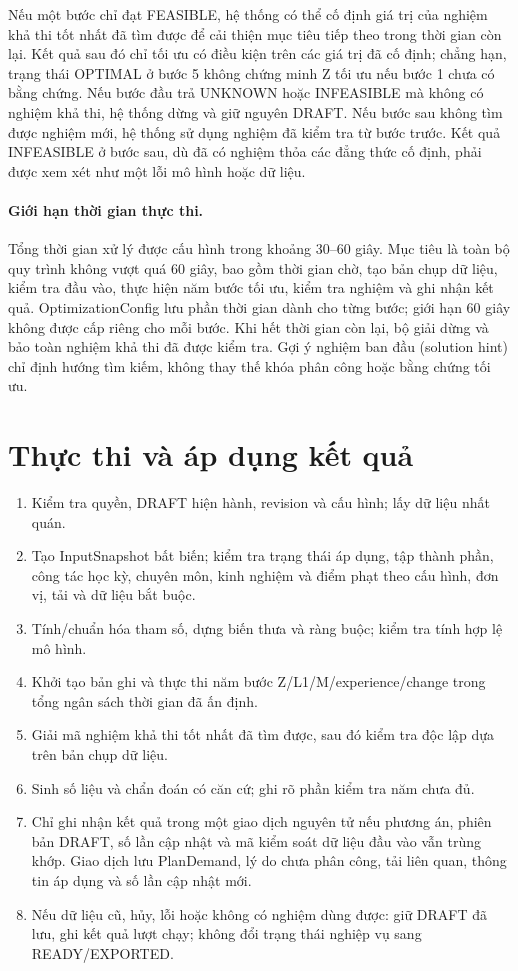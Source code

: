 \documentclass[12pt,a4paper]{report}
\newcommand{\code}[1]{\texttt{\detokenize{#1}}}
\begin{document}
Nếu một bước chỉ đạt FEASIBLE, hệ thống có thể cố định giá trị của nghiệm khả thi tốt nhất đã tìm được để cải thiện mục tiêu tiếp theo trong thời gian còn lại. Kết quả sau đó chỉ tối ưu có điều kiện trên các giá trị đã cố định; chẳng hạn, trạng thái OPTIMAL ở bước 5 không chứng minh Z tối ưu nếu bước 1 chưa có bằng chứng. Nếu bước đầu trả UNKNOWN hoặc INFEASIBLE mà không có nghiệm khả thi, hệ thống dừng và giữ nguyên DRAFT. Nếu bước sau không tìm được nghiệm mới, hệ thống sử dụng nghiệm đã kiểm tra từ bước trước. Kết quả INFEASIBLE ở bước sau, dù đã có nghiệm thỏa các đẳng thức cố định, phải được xem xét như một lỗi mô hình hoặc dữ liệu.

\paragraph{Giới hạn thời gian thực thi.}
Tổng thời gian xử lý được cấu hình trong khoảng 30--60 giây. Mục tiêu là toàn bộ quy trình không vượt quá 60 giây, bao gồm thời gian chờ, tạo bản chụp dữ liệu, kiểm tra đầu vào, thực hiện năm bước tối ưu, kiểm tra nghiệm và ghi nhận kết quả. OptimizationConfig lưu phần thời gian dành cho từng bước; giới hạn 60 giây không được cấp riêng cho mỗi bước. Khi hết thời gian còn lại, bộ giải dừng và bảo toàn nghiệm khả thi đã được kiểm tra. Gợi ý nghiệm ban đầu (solution hint) chỉ định hướng tìm kiếm, không thay thế khóa phân công hoặc bằng chứng tối ưu.



\section{Thực thi và áp dụng kết quả}\label{sec:solver-integration}
\begin{enumerate}
\item Kiểm tra quyền, DRAFT hiện hành, revision và cấu hình; lấy dữ liệu nhất quán.
\item Tạo InputSnapshot bất biến; kiểm tra trạng thái áp dụng, tập thành phần,
công tác học kỳ, chuyên môn, kinh nghiệm và điểm phạt theo cấu hình, đơn vị, tải và dữ liệu bắt buộc.
\item Tính/chuẩn hóa tham số, dựng biến thưa và ràng buộc; kiểm tra tính hợp lệ mô hình.
\item Khởi tạo bản ghi \code{SolverRun} và thực thi năm bước Z/L1/M/experience/change trong tổng ngân sách thời gian đã ấn định.
\item Giải mã nghiệm khả thi tốt nhất đã tìm được, sau đó kiểm tra độc lập dựa trên bản chụp dữ liệu.
\item Sinh số liệu và chẩn đoán có căn cứ; ghi rõ phần kiểm tra năm chưa đủ.
\item Chỉ ghi nhận kết quả trong một giao dịch nguyên tử nếu phương án, phiên bản DRAFT, số lần cập nhật và mã kiểm soát dữ liệu đầu vào vẫn trùng khớp. Giao dịch lưu PlanDemand, lý do chưa phân công, tải liên quan, thông tin áp dụng và số lần cập nhật mới.
\item Nếu dữ liệu cũ, hủy, lỗi hoặc không có nghiệm dùng được: giữ DRAFT đã lưu,
ghi kết quả lượt chạy; không đổi trạng thái nghiệp vụ sang READY/EXPORTED.
\end{enumerate}
\end{document}
